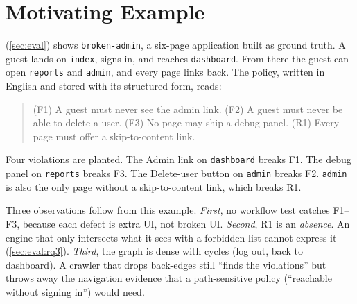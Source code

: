 \section{Motivating Example}
\label{sec:background}

 (\cref{sec:eval}) shows \texttt{broken-admin}, a six-page
application built as ground truth. A guest lands on \texttt{index}, signs in,
and reaches \texttt{dashboard}. From there the guest can open
\texttt{reports} and \texttt{admin}, and every page links back. The policy,
written in English and stored with its structured form, reads:

\begin{quote}\small
(F1) A guest must never see the admin link.
(F2) A guest must never be able to delete a user.
(F3) No page may ship a debug panel.
(R1) Every page must offer a skip-to-content link.
\end{quote}

Four violations are planted. The Admin link on \texttt{dashboard} breaks F1.
The debug panel on \texttt{reports} breaks F3. The Delete-user button on
\texttt{admin} breaks F2. \texttt{admin} is also the only page without a
skip-to-content link, which breaks R1.

Three observations follow from this example. \emph{First}, no workflow test
catches F1--F3, because each defect is extra UI, not broken UI. \emph{Second},
R1 is an \emph{absence}. An engine that only intersects what it sees with a
forbidden list cannot express it (\cref{sec:eval:rq3}). \emph{Third}, the
graph is dense with cycles (log out, back to dashboard). A crawler that drops
back-edges still ``finds the violations'' but throws away the navigation
evidence that a path-sensitive policy (``reachable without signing in'') would
need.
